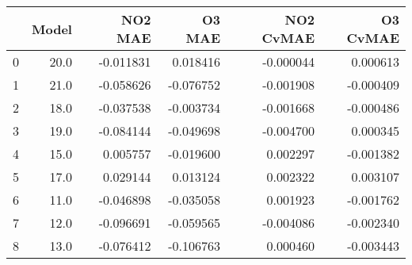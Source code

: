 \begin{tabular}{lrrrrr}
\toprule
{} &  Model &   NO2 MAE &    O3 MAE &  NO2 CvMAE &  O3 CvMAE \\
\midrule
0 &   20.0 & -0.011831 &  0.018416 &  -0.000044 &  0.000613 \\
1 &   21.0 & -0.058626 & -0.076752 &  -0.001908 & -0.000409 \\
2 &   18.0 & -0.037538 & -0.003734 &  -0.001668 & -0.000486 \\
3 &   19.0 & -0.084144 & -0.049698 &  -0.004700 &  0.000345 \\
4 &   15.0 &  0.005757 & -0.019600 &   0.002297 & -0.001382 \\
5 &   17.0 &  0.029144 &  0.013124 &   0.002322 &  0.003107 \\
6 &   11.0 & -0.046898 & -0.035058 &   0.001923 & -0.001762 \\
7 &   12.0 & -0.096691 & -0.059565 &  -0.004086 & -0.002340 \\
8 &   13.0 & -0.076412 & -0.106763 &   0.000460 & -0.003443 \\
\bottomrule
\end{tabular}
